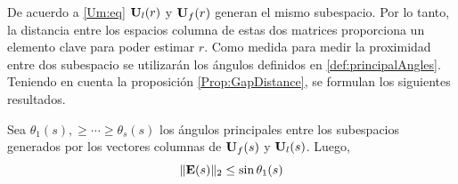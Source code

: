 De acuerdo a \eqref{Um:eq} $\mathbf{U}_l(r)$ y $\mathbf{U}_f(r)$ generan el mismo subespacio. Por lo tanto, la distancia entre los espacios columna de estas dos matrices proporciona un elemento clave para poder estimar $r$. Como medida para medir la proximidad entre dos subespacio se utilizarán los ángulos definidos en \eqref{def:principalAngles}. Teniendo en cuenta la proposición \eqref{Prop:GapDistance}, se formulan los siguientes resultados.

\begin{theorem}\label{The1:ESTER_GAP}
	Sea $\theta_1(s),\ge\cdots\ge\theta_s(s)$ los ángulos principales entre los subespacios generados por los vectores columnas de $\mathbf{U}_f(s)$ y $\mathbf{U}_l(s)$. Luego,
	\begin{equation}
		\|\mathbf{E}(s)\|_2  \le \sin\theta_1(s)
		\label{Eq:ESTERBound}
	\end{equation}
\end{theorem}  
